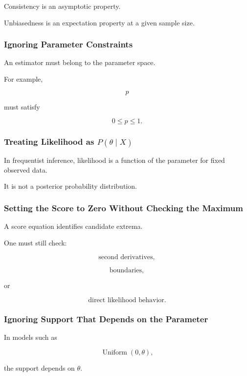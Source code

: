 Consistency is an asymptotic property.

Unbiasedness is an expectation property at a given sample size.

\subsubsection{Ignoring Parameter Constraints}

An estimator must belong to the parameter space.

For example,

\[
p
\]

must satisfy

\[
0\leq p\leq1.
\]

\subsubsection{Treating Likelihood as \(P(\theta\mid X)\)}

In frequentist inference, likelihood is a function of the parameter for
fixed observed data.

It is not a posterior probability distribution.

\subsubsection{Setting the Score to Zero Without Checking the Maximum}

A score equation identifies candidate extrema.

One must still check:

\[
\boxed{
\text{second derivatives},
}
\]

\[
\boxed{
\text{boundaries},
}
\]

or

\[
\boxed{
\text{direct likelihood behavior}.
}
\]

\subsubsection{Ignoring Support That Depends on the Parameter}

In models such as

\[
\operatorname{Uniform}(0,\theta),
\]

the support depends on \(\theta\).


